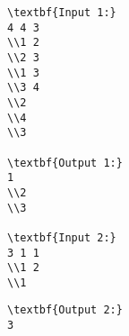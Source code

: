 \begin{verbatim}
\textbf{Input 1:}
4 4 3
\\1 2
\\2 3
\\1 3
\\3 4
\\2
\\4
\\3

\textbf{Output 1:}
1
\\2
\\3

\textbf{Input 2:}
3 1 1
\\1 2
\\1 \end{verbatim}
\begin{verbatim}
\textbf{Output 2:}
3\end{verbatim}